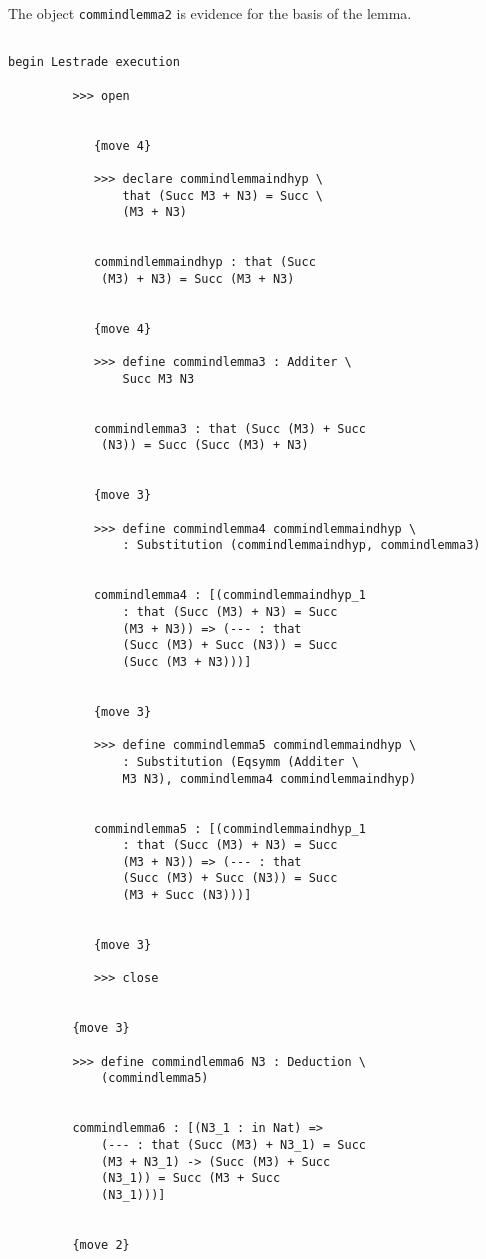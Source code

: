 \documentclass[12pt]{article}
\begin{document}
The object {\tt commindlemma2} is evidence for the basis of the lemma.

\begin{verbatim}

begin Lestrade execution

         >>> open


            {move 4}

            >>> declare commindlemmaindhyp \
                that (Succ M3 + N3) = Succ \
                (M3 + N3)


            commindlemmaindhyp : that (Succ 
             (M3) + N3) = Succ (M3 + N3)


            {move 4}

            >>> define commindlemma3 : Additer \
                Succ M3 N3


            commindlemma3 : that (Succ (M3) + Succ 
             (N3)) = Succ (Succ (M3) + N3)


            {move 3}

            >>> define commindlemma4 commindlemmaindhyp \
                : Substitution (commindlemmaindhyp, commindlemma3)


            commindlemma4 : [(commindlemmaindhyp_1 
                : that (Succ (M3) + N3) = Succ 
                (M3 + N3)) => (--- : that 
                (Succ (M3) + Succ (N3)) = Succ 
                (Succ (M3 + N3)))]


            {move 3}

            >>> define commindlemma5 commindlemmaindhyp \
                : Substitution (Eqsymm (Additer \
                M3 N3), commindlemma4 commindlemmaindhyp)


            commindlemma5 : [(commindlemmaindhyp_1 
                : that (Succ (M3) + N3) = Succ 
                (M3 + N3)) => (--- : that 
                (Succ (M3) + Succ (N3)) = Succ 
                (M3 + Succ (N3)))]


            {move 3}

            >>> close


         {move 3}

         >>> define commindlemma6 N3 : Deduction \
             (commindlemma5)


         commindlemma6 : [(N3_1 : in Nat) => 
             (--- : that (Succ (M3) + N3_1) = Succ 
             (M3 + N3_1) -> (Succ (M3) + Succ 
             (N3_1)) = Succ (M3 + Succ 
             (N3_1)))]


         {move 2}


\end{verbatim}
\end{document}
